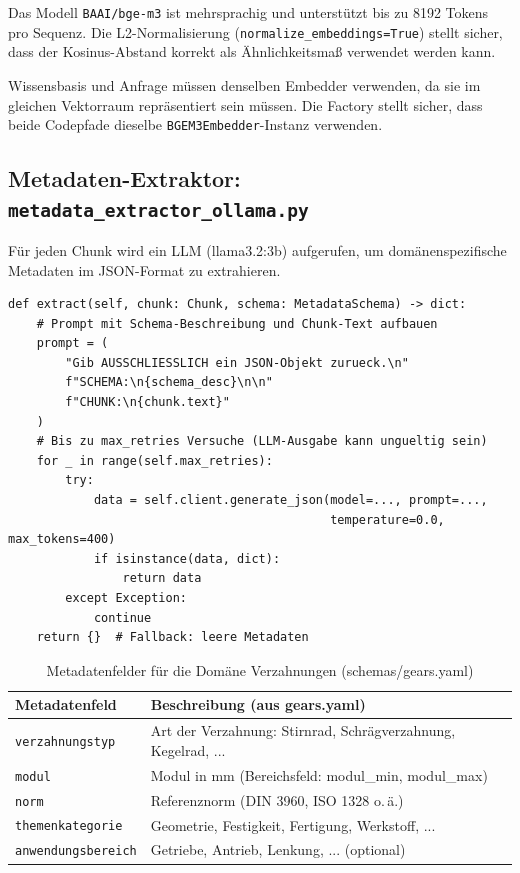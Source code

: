 \documentclass[12pt, a4paper]{article}
\begin{document}
Das Modell \texttt{BAAI/bge-m3} ist mehrsprachig und unterstützt bis zu 8192 Tokens
pro Sequenz. Die L2-Normalisierung (\texttt{normalize\_embeddings=True}) stellt sicher,
dass der Kosinus-Abstand korrekt als Ähnlichkeitsmaß verwendet werden kann.

\begin{definitionbox}
Wissensbasis und Anfrage müssen denselben Embedder verwenden, da sie im gleichen
Vektorraum repräsentiert sein müssen. Die Factory stellt sicher, dass beide
Codepfade dieselbe \texttt{BGEM3Embedder}-Instanz verwenden.
\end{definitionbox}

\subsection{Metadaten-Extraktor: \texttt{metadata\_extractor\_ollama.py}}

Für jeden Chunk wird ein LLM (llama3.2:3b) aufgerufen, um domänenspezifische
Metadaten im JSON-Format zu extrahieren.

\begin{lstlisting}[style=pythonstyle, caption={LLM-basierte Metadatenextraktion}]
def extract(self, chunk: Chunk, schema: MetadataSchema) -> dict:
    # Prompt mit Schema-Beschreibung und Chunk-Text aufbauen
    prompt = (
        "Gib AUSSCHLIESSLICH ein JSON-Objekt zurueck.\n"
        f"SCHEMA:\n{schema_desc}\n\n"
        f"CHUNK:\n{chunk.text}"
    )
    # Bis zu max_retries Versuche (LLM-Ausgabe kann ungueltig sein)
    for _ in range(self.max_retries):
        try:
            data = self.client.generate_json(model=..., prompt=...,
                                             temperature=0.0, max_tokens=400)
            if isinstance(data, dict):
                return data
        except Exception:
            continue
    return {}  # Fallback: leere Metadaten
\end{lstlisting}

\begin{table}[H]
\centering
\small
\begin{tabular}{lp{9cm}}
\toprule
\textbf{Metadatenfeld} & \textbf{Beschreibung (aus gears.yaml)} \\
\midrule
\texttt{verzahnungstyp} & Art der Verzahnung: Stirnrad, Schrägverzahnung, Kegelrad, ... \\
\texttt{modul} & Modul in mm (Bereichsfeld: modul\_min, modul\_max) \\
\texttt{norm} & Referenznorm (DIN 3960, ISO 1328 o.\,ä.) \\
\texttt{themenkategorie} & Geometrie, Festigkeit, Fertigung, Werkstoff, ... \\
\texttt{anwendungsbereich} & Getriebe, Antrieb, Lenkung, ... (optional) \\
\bottomrule
\end{tabular}
\caption{Metadatenfelder für die Domäne Verzahnungen (schemas/gears.yaml)}
\end{table}
\end{document}
